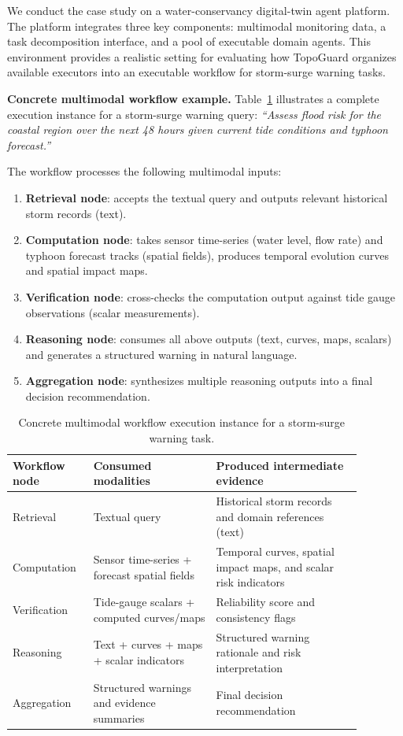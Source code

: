 \documentclass[manuscript,review,anonymous]{acmart}
\begin{document}
We conduct the case study on a water-conservancy digital-twin agent platform. The platform integrates three key components: multimodal monitoring data, a task decomposition interface, and a pool of executable domain agents. This environment provides a realistic setting for evaluating how TopoGuard organizes available executors into an executable workflow for storm-surge warning tasks.

\medskip
\noindent\textbf{Concrete multimodal workflow example.}
Table~\ref{tab:multimodal_workflow_example} illustrates a complete execution instance for a storm-surge warning query: \emph{``Assess flood risk for the coastal region over the next 48 hours given current tide conditions and typhoon forecast.''}

The workflow processes the following multimodal inputs:

\begin{enumerate}
    \item \textbf{Retrieval node}: accepts the textual query and outputs relevant historical storm records (text).
    \item \textbf{Computation node}: takes sensor time-series (water level, flow rate) and typhoon forecast tracks (spatial fields), produces temporal evolution curves and spatial impact maps.
    \item \textbf{Verification node}: cross-checks the computation output against tide gauge observations (scalar measurements).
    \item \textbf{Reasoning node}: consumes all above outputs (text, curves, maps, scalars) and generates a structured warning in natural language.
    \item \textbf{Aggregation node}: synthesizes multiple reasoning outputs into a final decision recommendation.
\end{enumerate}

\begin{table}[t]
\centering
\caption{Concrete multimodal workflow execution instance for a storm-surge warning task.}
\label{tab:multimodal_workflow_example}
\small
\begin{tabular}{p{0.18\linewidth}p{0.32\linewidth}p{0.38\linewidth}}
\toprule
\textbf{Workflow node} & \textbf{Consumed modalities} & \textbf{Produced intermediate evidence} \\
\midrule
Retrieval & Textual query & Historical storm records and domain references (text) \\
Computation & Sensor time-series + forecast spatial fields & Temporal curves, spatial impact maps, and scalar risk indicators \\
Verification & Tide-gauge scalars + computed curves/maps & Reliability score and consistency flags \\
Reasoning & Text + curves + maps + scalar indicators & Structured warning rationale and risk interpretation \\
Aggregation & Structured warnings and evidence summaries & Final decision recommendation \\
\bottomrule
\end{tabular}
\end{table}
\end{document}
